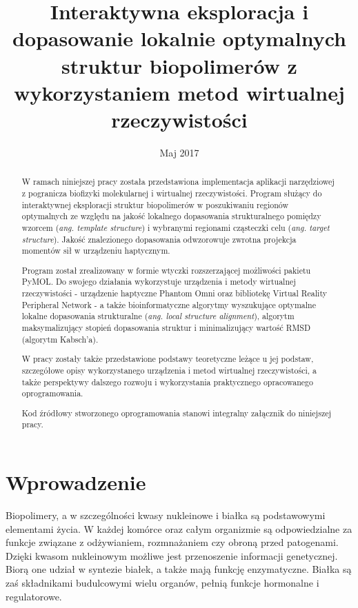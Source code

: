 \documentclass[licencjacka]{pracamgr}
\title{Interaktywna eksploracja i dopasowanie lokalnie optymalnych struktur biopolimerów z wykorzystaniem metod wirtualnej rzeczywistości}
\date{Maj 2017}
\begin{document}
\maketitle

\begin{abstract}
W ramach niniejszej pracy została przedstawiona implementacja aplikacji narzędziowej z pogranicza biofizyki molekularnej i wirtualnej rzeczywistości. Program służący do interaktywnej eksploracji struktur biopolimerów w poszukiwaniu regionów optymalnych ze względu na jakość lokalnego dopasowania strukturalnego pomiędzy wzorcem (\textit{ang. template structure}) i wybranymi regionami cząsteczki celu (\textit{ang. target structure}). Jakość znalezionego dopasowania odwzorowuje zwrotna projekcja momentów sił w urządzeniu haptycznym. 
	
Program został zrealizowany w formie wtyczki rozszerzającej możliwości pakietu PyMOL. Do swojego działania wykorzystuje urządzenia i metody wirtualnej rzeczywistości - urządzenie haptyczne Phantom Omni oraz bibliotekę Virtual Reality Peripheral Network - a także bioinformatyczne algorytmy wyszukujące optymalne lokalne dopasowania strukturalne (\textit{ang. local structure alignment}), algorytm maksymalizujący stopień dopasowania struktur i minimalizujący wartość RMSD (algorytm Kabsch'a).

W pracy zostały także przedstawione podstawy teoretyczne leżące u jej podstaw, szczegółowe opisy wykorzystanego urządzenia i metod wirtualnej rzeczywistości, a także perspektywy dalszego rozwoju i wykorzystania praktycznego opracowanego oprogramowania.

Kod źródłowy stworzonego oprogramowania stanowi integralny załącznik do niniejszej pracy.
\end{abstract}

\tableofcontents

\chapter*{Wprowadzenie}
Biopolimery, a w szczególności kwasy nukleinowe i białka są podstawowymi elementami życia. W każdej komórce oraz całym organizmie są odpowiedzialne za funkcje związane z odżywianiem, rozmnażaniem czy obroną przed patogenami. Dzięki kwasom nukleinowym możliwe jest przenoszenie informacji genetycznej. Biorą one udział w syntezie białek, a także mają funkcję enzymatyczne. Białka są zaś składnikami budulcowymi wielu organów, pełnią funkcje hormonalne i regulatorowe.
\end{document}
